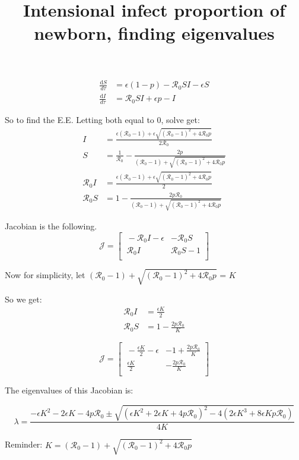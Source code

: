 \documentclass[12pt]{article}
\title{Intensional infect proportion of newborn, finding eigenvalues}
\begin{document}
\maketitle
\begin{align}
\frac{\mathrm{d}S}{d\tau}&=\epsilon(1-p)- \mathcal{R}_0  SI-\epsilon S \\
\frac{\mathrm{d}I}{d\tau}&=\mathcal{R}_0 SI+\epsilon p-I
\end{align}

So to find the E.E. Letting both equal to 0, solve get:
\begin{align}
I &= \frac{\epsilon(\mathcal{R}_0 -1)+ \epsilon \sqrt{(\mathcal{R}_0-1)^2+4\mathcal{R}_0 p}}{2\mathcal{R}_0}\\
S &=\frac{1}{\mathcal{R}_0}-\frac{2p}{(\mathcal{R}_0 -1)+ \sqrt{(\mathcal{R}_0-1)^2+4\mathcal{R}_0 p}}\\
\mathcal{R}_0 I &= \frac{\epsilon(\mathcal{R}_0 -1)+ \epsilon \sqrt{(\mathcal{R}_0-1)^2+4\mathcal{R}_0 p}}{2}\\
\mathcal{R}_0 S &= 1-\frac{2p \mathcal{R}_0}{(\mathcal{R}_0 -1)+ \sqrt{(\mathcal{R}_0-1)^2+4\mathcal{R}_0 p}}
\end{align}

Jacobian is the following.
\begin{equation}
\mathcal{J} =
\begin{bmatrix}
    \ -\mathcal{R}_0 I-\epsilon       & -\mathcal{R}_0 S \\
    \ \mathcal{R}_0 I       & \mathcal{R}_0 S-1 \\
\end{bmatrix}
\end{equation}

Now for simplicity, let $(\mathcal{R}_0 -1)+ \sqrt{(\mathcal{R}_0-1)^2+4\mathcal{R}_0 p}$ = $K$

So we get:
\begin{align}
\mathcal{R}_0 I &= \frac{\epsilon K}{2}\\
\mathcal{R}_0 S &= 1-\frac{2p \mathcal{R}_0}{K}
\end{align}

\begin{equation}
\mathcal{J} =
\begin{bmatrix}
    \ -\frac{\epsilon K}{2}-\epsilon       & -1+\frac{2p \mathcal{R}_0}{K} \\
    \ \frac{\epsilon K}{2}       & -\frac{2p \mathcal{R}_0}{K} \\
\end{bmatrix}
\end{equation}

The eigenvalues of this Jacobian is:

\begin{equation}
\lambda = \frac{-\epsilon K^2-2\epsilon K -4p\mathcal{R}_0 \pm \sqrt{(\epsilon K^2+2\epsilon K +4p\mathcal{R}_0)^2-4(2\epsilon K^3+8\epsilon Kp\mathcal{R}_0)}}{4K}
\end{equation}

Reminder: $K=(\mathcal{R}_0 -1)+ \sqrt{(\mathcal{R}_0-1)^2+4\mathcal{R}_0 p}$
\end{document}

